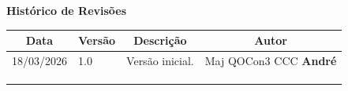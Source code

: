 \begin{table}[h]
	\begin{center}
	    \textbf{\Huge{Histórico de Revisões}}
	\end{center}
    \centering
	\begin{tabular}{|p{3cm}|p{1.5cm}|p{7.5cm}|p{3.2cm}|}
		\hline \multicolumn{1}{|c|}{\textbf{Data}} & \multicolumn{1}{|c|}{\textbf{Versão}} &
			\multicolumn{1}{|c|}{\textbf{Descrição}} & \multicolumn{1}{|c|}{\textbf{Autor}} \\ \hline
		18/03/2026 & 1.0 & Versão inicial. & Maj QOCon3 CCC \textbf{André} \\ \hline
		& & & \\ \hline
		& & & \\ \hline
		& & & \\ \hline
	\end{tabular}
\end{table}